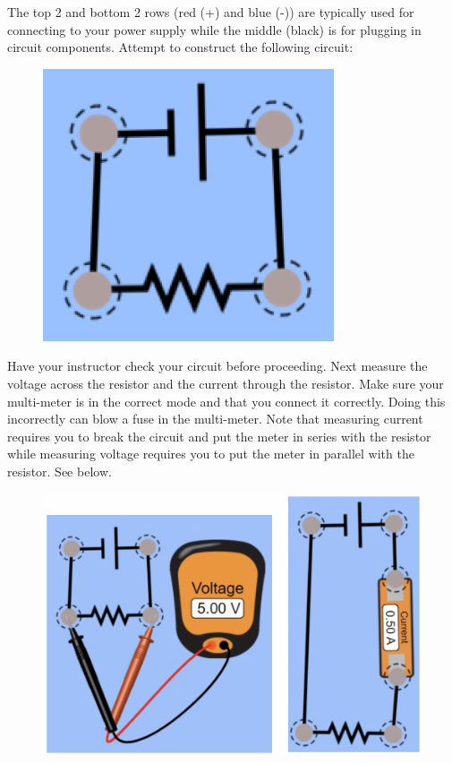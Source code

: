 The top 2 and bottom 2 rows (red (+) and blue (-)) are typically used for connecting to your power supply while the middle (black) is for plugging in circuit components.
Attempt to construct the following circuit:

\begin{figure}[H]
\includegraphics[scale=0.80]{figures/resistor-circuits/one-resistor.png}
\end{figure}

Have your instructor check your circuit before proceeding.
Next measure the voltage across the resistor and the current through the resistor.
Make sure your multi-meter is in the correct mode and that you connect it correctly.
Doing this incorrectly can blow a fuse in the multi-meter.
Note that measuring current requires you to break the circuit and put the meter in series with the resistor while measuring voltage requires you to put the meter in parallel with the resistor.
See below.

\begin{figure}[H]
\includegraphics[scale=0.55]{figures/resistor-circuits/V-I-measurement.png}
\end{figure}

